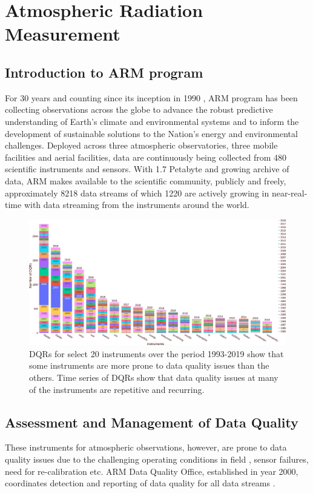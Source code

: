 \section{Atmospheric Radiation Measurement}
\subsection{Introduction to ARM program}
For 30 years and counting since its inception in 1990
\cite{Turner_AMS_2016}, ARM program has
been collecting observations across the globe to advance the robust
predictive understanding of Earth's climate and environmental systems
and to inform the development of sustainable solutions to the Nation's
energy and environmental challenges. Deployed across three atmospheric
observatories, three mobile facilities and aerial facilities, data are
continuously being collected from 480 scientific instruments and
sensors. With 1.7 Petabyte and growing archive of data, ARM makes
available to the scientific community, publicly and freely,
approximately 8218 data streams of which 1220 are actively growing in
near-real-time with data streaming from the instruments around the
world.

\begin{figure}
 \includegraphics[width=\linewidth]{figures/dqr_by_instrument_20.png}
 \caption{DQRs for select 20 instruments over the period 1993-2019 show
 that some instruments are more prone to data quality issues than
 the others. Time series of DQRs show that data quality issues at many
 of the instruments are repetitive and recurring.}
 \label{fig:dqr_by_instrument}
\end{figure}


\subsection{Assessment and Management of Data Quality}
These instruments for atmospheric observations, however, are prone to data quality issues due to
the challenging operating conditions in field
, sensor failures, need for
re-calibration etc. ARM Data Quality Office, established in year 2000,
coordinates detection and reporting of data quality for all data streams
\cite{Peppler_AMS_2016,peppler2005,peppler2008quality}.



